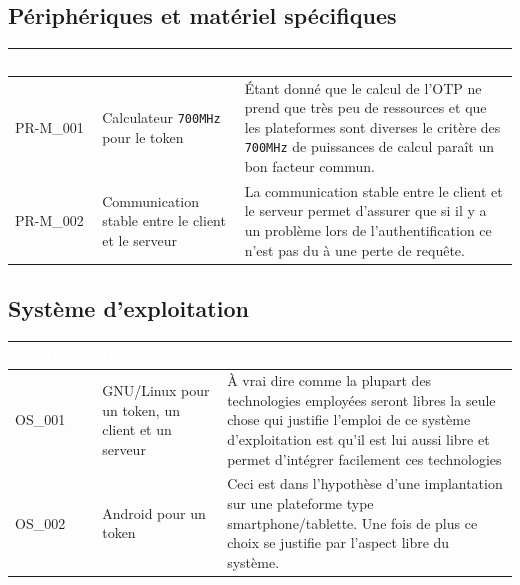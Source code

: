 \documentclass{"../../res/univ-projet"}
\begin{document}
\subsection{Périphériques et matériel spécifiques}
\begin{tabular}{|p{}|p{}|p{}|}
    \hline
    \rowcolor{gray}
    \textcolor{white}{\bfseries Identifiant} & 
    \textcolor{white}{\bfseries Description} &
    \textcolor{white}{\bfseries Justification} \\
    \hline
    PR-M\_001 &
    Calculateur \verb?700MHz? pour le token &
    Étant donn\'e que le calcul de l'OTP ne prend que très peu de ressources
            et que les plateformes sont diverses le critère des \verb?700MHz? de puissances
            de calcul paraît un bon facteur commun.\\
    \hline
    PR-M\_002 &
    Communication stable entre le client et le serveur &
    La communication stable entre le client et le serveur permet d'assurer que si
            il y a un problème lors de l'authentification ce n'est pas du à une perte de
            requête.\\
    \hline
\end{tabular}

\subsection{Système d'exploitation}
\begin{tabular}{|p{}|p{}|p{}|}
    \hline
    \rowcolor{gray}
    \textcolor{white}{\bfseries Identifiant} & 
    \textcolor{white}{\bfseries Description} &
    \textcolor{white}{\bfseries Justification} \\
    \hline
    OS\_001& 
    GNU/Linux pour un token, un client et un serveur&
    À vrai dire comme la plupart des technologies employ\'ees seront libres
    la seule chose qui justifie l'emploi de ce système d'exploitation
    est qu'il est lui aussi libre et permet d'int\'egrer facilement ces technologies\\
    \hline
    OS\_002&
    Android pour un token&
    Ceci est dans l'hypothèse d'une implantation sur une plateforme type
    smartphone/tablette. Une fois de plus ce choix se justifie par
    l'aspect libre du système.\\
    \hline
\end{tabular}
\end{document}
